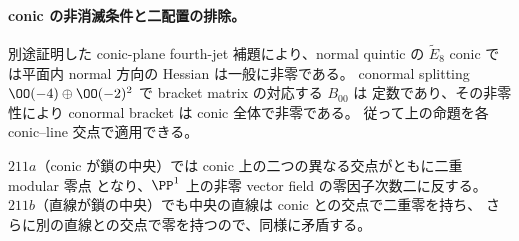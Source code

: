 \paragraph{conic の非消滅条件と二配置の排除。}
別途証明した conic-plane fourth-jet 補題により、normal quintic の $\widetilde E_8$ conic
では平面内 normal 方向の Hessian は一般に非零である。
conormal splitting $\OO(-4)\oplus\OO(-2)^2$ で bracket matrix の対応する $B_{00}$ は
定数であり、その非零性により conormal bracket は conic 全体で非零である。
従って上の命題を各 conic--line 交点で適用できる。

$211a$（conic が鎖の中央）では conic 上の二つの異なる交点がともに二重 modular 零点
となり、$\PP^1$ 上の非零 vector field の零因子次数二に反する。
$211b$（直線が鎖の中央）でも中央の直線は conic との交点で二重零を持ち、
さらに別の直線との交点で零を持つので、同様に矛盾する。
